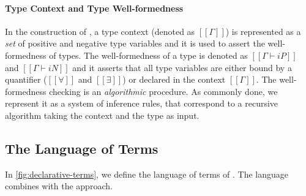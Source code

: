 \paragraph{Type Context and Type Well-formedness}

In the construction of \fexists, a type context (denoted as $[[Γ]]$) is
represented as a \emph{set} of positive and negative type variables and it is used to
assert the well-formedness of types. The well-formedness of a type is denoted as
$[[Γ ⊢ iP]]$ and $[[Γ ⊢ iN]]$ and it asserts that all type variables are either
bound by a quantifier ($[[∀]]$ and $[[∃]]$) or declared in the context $[[Γ]]$.
The well-formedness checking is an \emph{algorithmic} procedure. As commonly
done, we represent it as a system of inference rules, that correspond to a
recursive algorithm taking the context and the type as input. 

\subsection{The Language of Terms}

In \cref{fig:declarative-terms}, we define the language of terms of 
\fexists. The language combines \systemf with the \CBPV approach.

